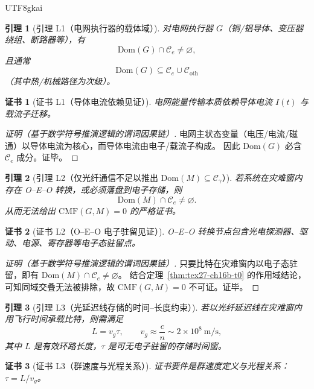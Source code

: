 \documentclass[12pt]{article}
\newtheorem{lemma}{引理}[section]
\newtheorem{Certificate}{证书}[section]
\begin{document}
\begin{CJK*}{UTF8}{gkai}
\begin{lemma}[引理 L1（电网执行器的载体域）]
\label{lem:tex27-ch16b-l1}
对电网执行器 $G$（铜/铝导体、变压器绕组、断路器等），有
\[
  \mathrm{Dom}(G)\cap\mathcal{C}_{e}\neq\varnothing,
\]
且通常
\[
  \mathrm{Dom}(G)\subseteq\mathcal{C}_{e}\cup\mathcal{C}_{\mathrm{oth}}
\]
（其中热/机械路径为次级）。
\end{lemma}

\begin{Certificate}[证书 L1（导体电流依赖见证）]
\label{cert:tex27-ch16b-l1}
电网能量传输本质依赖导体电流 $I(t)$ 与载流子迁移。
\end{Certificate}

\begin{proof}[证明（基于数学符号推演逻辑的谓词因果链）]
电网主状态变量（电压/电流/磁通）以导体电流为核心，而导体电流由电子/载流子构成。
因此 $\mathrm{Dom}(G)$ 必含 $\mathcal{C}_{e}$ 成分。证毕。
\end{proof}

\begin{lemma}[引理 L2（仅光纤通信不足以推出 \texorpdfstring{$\mathrm{Dom}(M)\subseteq\mathcal{C}_{\gamma}$}{Dom(M) subset Cgamma}）]
\label{lem:tex27-ch16b-l2}
若系统在灾难窗内存在 O--E--O 转换，或必须落盘到电子存储，则
\[
  \mathrm{Dom}(M)\cap\mathcal{C}_{e}\neq\varnothing.
\]
从而无法给出 $\mathrm{CMF}(G,M)=0$ 的严格证书。
\end{lemma}

\begin{Certificate}[证书 L2（O--E--O 电子驻留见证）]
\label{cert:tex27-ch16b-l2}
O--E--O 转换节点包含光电探测器、驱动、电源、寄存器等电子态驻留点。
\end{Certificate}

\begin{proof}[证明（基于数学符号推演逻辑的谓词因果链）]
只要比特在灾难窗内以电子态驻留，即有 $\mathrm{Dom}(M)\cap\mathcal{C}_{e}\neq\varnothing$。
结合定理~\ref{thm:tex27-ch16b-t0} 的作用域结论，可知同域交叠无法被排除，故 $\mathrm{CMF}(G,M)=0$ 不可证。证毕。
\end{proof}

\begin{lemma}[引理 L3（光延迟线存储的时间--长度约束）]
\label{lem:tex27-ch16b-l3}
若以光纤延迟线在灾难窗内用飞行时间承载比特，则需满足
\[
  L=v_g\tau,
  \qquad
  v_g\approx \frac{c}{n}\sim 2\times 10^8\ \mathrm{m/s},
\]
其中 $L$ 是有效环路长度，$\tau$ 是可无电子驻留的存储时间窗。
\end{lemma}

\begin{Certificate}[证书 L3（群速度与光程关系）]
\label{cert:tex27-ch16b-l3}
证书要件是群速度定义与光程关系：$\tau=L/v_g$。
\end{Certificate}


\end{CJK*}
\end{document}
